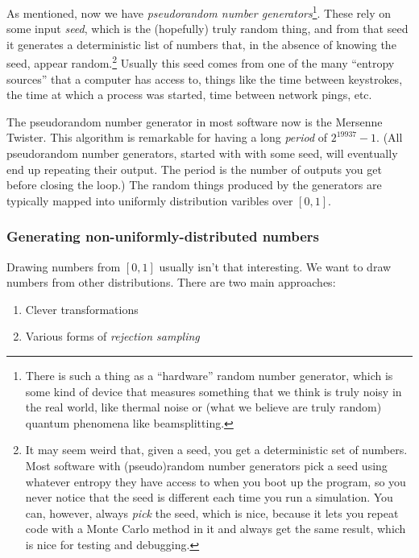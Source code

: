 \documentclass{book}
\providecommand{\tightlist}{%
  \setlength{\itemsep}{0pt}\setlength{\parskip}{0pt}}
\begin{document}
As mentioned, now we have \emph{pseudorandom number
generators}\footnote{There is such a thing as a ``hardware'' random
  number generator, which is some kind of device that measures something
  that we think is truly noisy in the real world, like thermal noise or
  (what we believe are truly random) quantum phenomena like
  beamsplitting.}. These rely on some input \emph{seed}, which is the
(hopefully) truly random thing, and from that seed it generates a
deterministic list of numbers that, in the absence of knowing the seed,
appear random.\footnote{It may seem weird that, given a seed, you get a
  deterministic set of numbers. Most software with (pseudo)random number
  generators pick a seed using whatever entropy they have access to when
  you boot up the program, so you never notice that the seed is
  different each time you run a simulation. You can, however, always
  \emph{pick} the seed, which is nice, because it lets you repeat code
  with a Monte Carlo method in it and always get the same result, which
  is nice for testing and debugging.} Usually this seed comes from one
of the many ``entropy sources'' that a computer has access to, things
like the time between keystrokes, the time at which a process was
started, time between network pings, etc.

The pseudorandom number generator in most software now is the Mersenne
Twister. This algorithm is remarkable for having a long \emph{period} of
\(2^{19937} - 1\). (All pseudorandom number generators, started with
with some seed, will eventually end up repeating their output. The
period is the number of outputs you get before closing the loop.) The
random things produced by the generators are typically mapped into
uniformly distribution varibles over \([0, 1]\).

\subsubsection{Generating non-uniformly-distributed
numbers}\label{generating-non-uniformly-distributed-numbers}

Drawing numbers from \([0, 1]\) usually isn't that interesting. We want
to draw numbers from other distributions. There are two main approaches:

\begin{enumerate}
\def\labelenumi{\arabic{enumi}.}
\tightlist
\item
  Clever transformations
\item
  Various forms of \emph{rejection sampling}
\end{enumerate}
\end{document}
